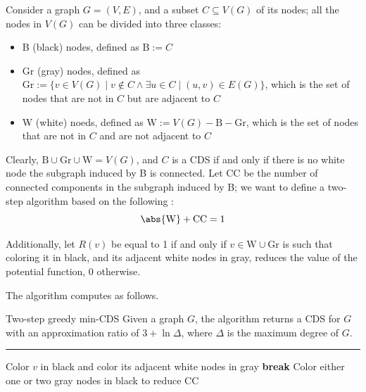 \documentclass[a4paper, 12pt]{report}
\begin{document}
    Consider a graph $G = (V, E)$, and a subset $C \subseteq V(G)$ of its nodes; all the nodes in $V(G)$ can be divided into three classes:

    \begin{itemize}
        \item B (black) nodes, defined as $\mathrm B := C$
        \item Gr (gray) nodes, defined as $\mathrm {Gr} := \{v \in V(G) \mid v \notin C \land \exists u \in C \mid (u, v) \in E(G)\}$, which is the set of nodes that are not in $C$ but are adjacent to $C$
        \item W (white) noeds, defined as $\mathrm W := V(G) - \mathrm B - \mathrm{Gr}$, which is the set of nodes that are not in $C$ and are not adjacent to $C$
    \end{itemize}

    Clearly, $\mathrm B \cup \mathrm{Gr} \cup \mathrm W = V(G)$, and $C$ is a CDS if and only if there is no white node  the subgraph induced by B is connected. Let CC be the number of connected components in the subgraph induced by B; we want to define a two-step algorithm based on the following : $$\abs {\mathrm W} + \mathrm{CC} = 1$$

    Additionally, let $R(v)$ be equal to 1 if and only if $v \in \mathrm W \cup \mathrm{Gr}$ is such that coloring it in black, and its adjacent white nodes in gray, reduces the value of the potential function, 0 otherwise.

    The algorithm computes as follows.

    \begin{framedalgo}{Two-step greedy min-CDS}
        Given a graph $G$, the algorithm returns a CDS for $G$ with an approximation ratio of $3 + \ln \Delta$, where $\Delta$ is the maximum degree of $G$. \\
        \hrule

        \quad
        \label{alg:greedy_min-CDS}
        \begin{algorithmic}[1]
                        \State Color $v$ in black and color its adjacent white nodes in gray
                    \Else
                        \State \textbf{break}
                    \EndIf
                \EndWhile
                \Do
                    \State Color either one or two gray nodes in black to reduce CC
            \EndFunction
        \end{algorithmic}
    \end{framedalgo}
\end{document}
